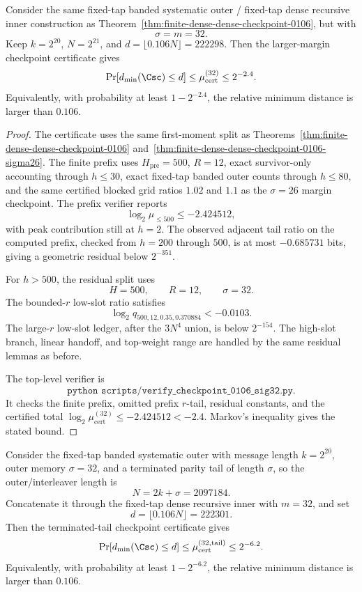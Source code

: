 \begin{theorem}
\label{thm:finite-dense-dense-checkpoint-0106-sigma32}
Consider the same fixed-tap banded systematic outer / fixed-tap dense recursive inner construction as
Theorem~\ref{thm:finite-dense-dense-checkpoint-0106}, but with
\[
\sigma=m=32.
\]
Keep \(k=2^{20}\), \(N=2^{21}\), and \(d=\lfloor0.106N\rfloor=222298\).  Then the larger-margin checkpoint certificate
gives
\[
\Pr[d_{\min}(\Csc)\le d]
\le
\mu_{\mathrm{cert}}^{(32)}
\le
2^{-2.4}.
\]
Equivalently, with probability at least \(1-2^{-2.4}\), the relative minimum distance is larger than \(0.106\).
\end{theorem}

\begin{proof}
The certificate uses the same first-moment split as
Theorems~\ref{thm:finite-dense-dense-checkpoint-0106} and~\ref{thm:finite-dense-dense-checkpoint-0106-sigma26}.  The
finite prefix uses \(H_{\mathrm{pre}}=500\), \(R=12\), exact survivor-only accounting through \(h\le30\), exact fixed-tap
banded outer counts through \(h\le80\), and the same certified blocked grid ratios \(1.02\) and \(1.1\) as the
\(\sigma=26\) margin checkpoint.  The prefix verifier reports
\[
\log_2\mu_{\le500}\le -2.424512,
\]
with peak contribution still at \(h=2\).  The observed adjacent tail ratio on the computed prefix, checked from
\(h=200\) through \(500\), is at most \(-0.685731\) bits, giving a geometric residual below \(2^{-351}\).

For \(h>500\), the residual split uses
\[
H=500,\qquad R=12,\qquad \sigma=32.
\]
The bounded-\(r\) low-slot ratio satisfies
\[
\log_2 q_{500,12,0.35,0.370884}<-0.0103.
\]
The large-\(r\) low-slot ledger, after the \(3N^4\) union, is below \(2^{-154}\).  The high-slot branch, linear handoff,
and top-weight range are handled by the same residual lemmas as before.

The top-level verifier is
\[
\texttt{python scripts/verify\_checkpoint\_0106\_sig32.py}.
\]
It checks the finite prefix, omitted prefix \(r\)-tail, residual constants, and the certified total
\(\log_2\mu_{\mathrm{cert}}^{(32)}\le -2.424512<-2.4\).  Markov's inequality gives the stated bound.
\end{proof}

\begin{theorem}
\label{thm:finite-dense-dense-checkpoint-0106-sigma32-tail}
Consider the fixed-tap banded systematic outer with message length \(k=2^{20}\), outer memory \(\sigma=32\), and a
terminated parity tail of length \(\sigma\), so the outer/interleaver length is
\[
N=2k+\sigma=2097184.
\]
Concatenate it through the fixed-tap dense recursive inner with \(m=32\), and set
\[
d=\lfloor0.106N\rfloor=222301.
\]
Then the terminated-tail checkpoint certificate gives
\[
\Pr[d_{\min}(\Csc)\le d]
\le
\mu_{\mathrm{cert}}^{(32,\mathrm{tail})}
\le
2^{-6.2}.
\]
Equivalently, with probability at least \(1-2^{-6.2}\), the relative minimum distance is larger than \(0.106\).
\end{theorem}


